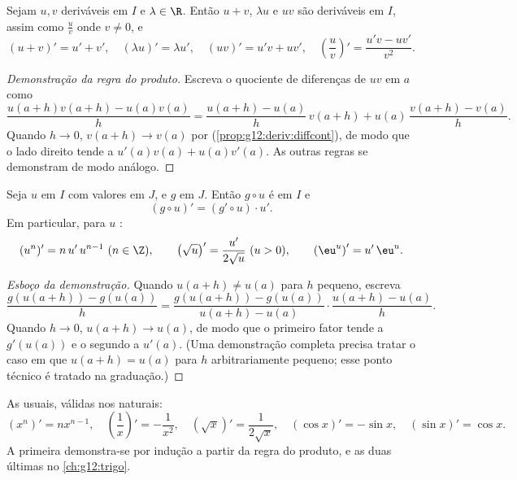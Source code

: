 \begin{proposition}[Operações]\label{prop:g12:deriv:operations}
Sejam $u, v$ deriváveis em $I$ e $\lambda \in \R$. Então $u + v$,
$\lambda u$ e $uv$ são deriváveis em $I$, assim como $\frac{u}{v}$ onde
$v \neq 0$, e
\[
(u+v)' = u' + v', \quad (\lambda u)' = \lambda u', \quad
(uv)' = u'v + uv', \quad
\left(\frac{u}{v}\right)' = \frac{u'v - uv'}{v^2}.
\]
\end{proposition}

\begin{proof}[Demonstração da regra do produto]
Escreva o quociente de diferenças de $uv$ em $a$ como
\[
\frac{u(a+h)v(a+h) - u(a)v(a)}{h}
= \frac{u(a+h) - u(a)}{h}\,v(a+h) + u(a)\,\frac{v(a+h) - v(a)}{h}.
\]
Quando $h \to 0$, $v(a+h) \to v(a)$ por 
(\cref{prop:g12:deriv:diffcont}), de modo que o lado direito tende a
$u'(a)v(a) + u(a)v'(a)$. As outras regras se demonstram de modo análogo.
\end{proof}

\begin{theorem}\label{thm:g12:deriv:chain}
Seja $u$  em $I$ com valores em $J$, e $g$  em $J$.
Então $g \circ u$ é  em $I$ e
\[
(g \circ u)' = (g' \circ u) \cdot u' .
\]
Em particular, para $u$ :
\[
(u^n)' = n\,u'\,u^{n-1} \ (n \in \Z), \qquad
\left(\sqrt{u}\right)' = \frac{u'}{2\sqrt{u}} \ (u > 0), \qquad
\left(\eu^{u}\right)' = u'\,\eu^{u}.
\]
\end{theorem}

\begin{proof}[Esboço da demonstração]
Quando $u(a+h) \neq u(a)$ para $h$ pequeno, escreva
\[
\frac{g(u(a+h)) - g(u(a))}{h}
= \frac{g(u(a+h)) - g(u(a))}{u(a+h) - u(a)} \cdot \frac{u(a+h) - u(a)}{h}.
\]
Quando $h \to 0$, $u(a+h) \to u(a)$, de modo que o primeiro fator tende a
$g'(u(a))$ e o segundo a $u'(a)$. (Uma demonstração completa precisa
tratar o caso em que $u(a+h) = u(a)$ para $h$ arbitrariamente pequeno;
esse ponto técnico é tratado na graduação.)
\end{proof}

\begin{example}
As  usuais, válidas nos  naturais:
\[
(x^n)' = nx^{n-1}, \quad
\left(\frac{1}{x}\right)' = -\frac{1}{x^2}, \quad
(\sqrt{x})' = \frac{1}{2\sqrt{x}}, \quad
(\cos x)' = -\sin x, \quad
(\sin x)' = \cos x .
\]
A primeira demonstra-se por indução a partir da regra do produto, e as
duas últimas no \cref{ch:g12:trigo}.
\end{example}

